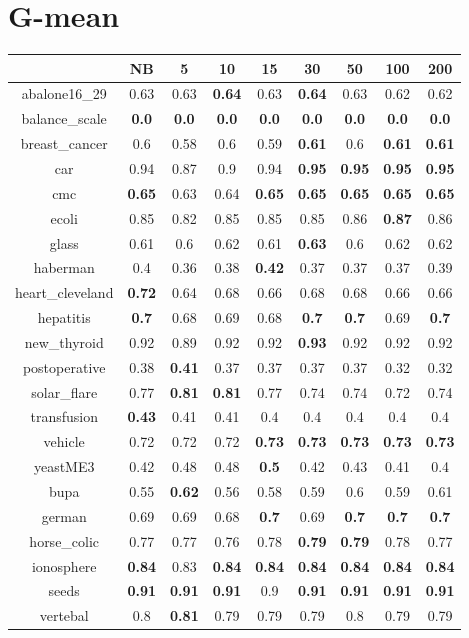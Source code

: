 \documentclass{article}%
\begin{document}
%
\section*{G{-}mean}%
\begin{tabular}{c|cccccccc}%
\hline%
&NB&5&10&15&30&50&100&200\\%
\hline%
abalone16\_29&0.63&0.63&\textbf{0.64}&0.63&\textbf{0.64}&0.63&0.62&0.62\\%
\hline%
balance\_scale&\textbf{0.0}&\textbf{0.0}&\textbf{0.0}&\textbf{0.0}&\textbf{0.0}&\textbf{0.0}&\textbf{0.0}&\textbf{0.0}\\%
\hline%
breast\_cancer&0.6&0.58&0.6&0.59&\textbf{0.61}&0.6&\textbf{0.61}&\textbf{0.61}\\%
\hline%
car&0.94&0.87&0.9&0.94&\textbf{0.95}&\textbf{0.95}&\textbf{0.95}&\textbf{0.95}\\%
\hline%
cmc&\textbf{0.65}&0.63&0.64&\textbf{0.65}&\textbf{0.65}&\textbf{0.65}&\textbf{0.65}&\textbf{0.65}\\%
\hline%
ecoli&0.85&0.82&0.85&0.85&0.85&0.86&\textbf{0.87}&0.86\\%
\hline%
glass&0.61&0.6&0.62&0.61&\textbf{0.63}&0.6&0.62&0.62\\%
\hline%
haberman&0.4&0.36&0.38&\textbf{0.42}&0.37&0.37&0.37&0.39\\%
\hline%
heart\_cleveland&\textbf{0.72}&0.64&0.68&0.66&0.68&0.68&0.66&0.66\\%
\hline%
hepatitis&\textbf{0.7}&0.68&0.69&0.68&\textbf{0.7}&\textbf{0.7}&0.69&\textbf{0.7}\\%
\hline%
new\_thyroid&0.92&0.89&0.92&0.92&\textbf{0.93}&0.92&0.92&0.92\\%
\hline%
postoperative&0.38&\textbf{0.41}&0.37&0.37&0.37&0.37&0.32&0.32\\%
\hline%
solar\_flare&0.77&\textbf{0.81}&\textbf{0.81}&0.77&0.74&0.74&0.72&0.74\\%
\hline%
transfusion&\textbf{0.43}&0.41&0.41&0.4&0.4&0.4&0.4&0.4\\%
\hline%
vehicle&0.72&0.72&0.72&\textbf{0.73}&\textbf{0.73}&\textbf{0.73}&\textbf{0.73}&\textbf{0.73}\\%
\hline%
yeastME3&0.42&0.48&0.48&\textbf{0.5}&0.42&0.43&0.41&0.4\\%
\hline%
bupa&0.55&\textbf{0.62}&0.56&0.58&0.59&0.6&0.59&0.61\\%
\hline%
german&0.69&0.69&0.68&\textbf{0.7}&0.69&\textbf{0.7}&\textbf{0.7}&\textbf{0.7}\\%
\hline%
horse\_colic&0.77&0.77&0.76&0.78&\textbf{0.79}&\textbf{0.79}&0.78&0.77\\%
\hline%
ionosphere&\textbf{0.84}&0.83&\textbf{0.84}&\textbf{0.84}&\textbf{0.84}&\textbf{0.84}&\textbf{0.84}&\textbf{0.84}\\%
\hline%
seeds&\textbf{0.91}&\textbf{0.91}&\textbf{0.91}&0.9&\textbf{0.91}&\textbf{0.91}&\textbf{0.91}&\textbf{0.91}\\%
\hline%
vertebal&0.8&\textbf{0.81}&0.79&0.79&0.79&0.8&0.79&0.79\\%
\hline%
\end{tabular}

%
\end{document}
